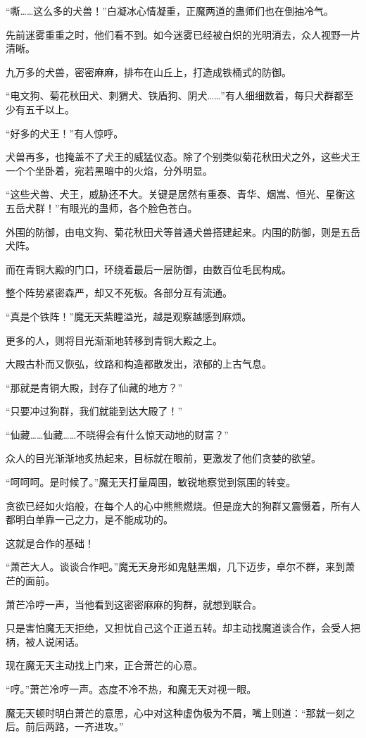 \begin{this_body}
“嘶……这么多的犬兽！”白凝冰心情凝重，正魔两道的蛊师们也在倒抽冷气。

先前迷雾重重之时，他们看不到。如今迷雾已经被白炽的光明消去，众人视野一片清晰。

九万多的犬兽，密密麻麻，排布在山丘上，打造成铁桶式的防御。

“电文狗、菊花秋田犬、刺猬犬、铁盾狗、阴犬……”有人细细数着，每只犬群都至少有五千以上。

“好多的犬王！”有人惊呼。

犬兽再多，也掩盖不了犬王的威猛仪态。除了个别类似菊花秋田犬之外，这些犬王一个个坐卧着，宛若黑暗中的火焰，分外明显。

“这些犬兽、犬王，威胁还不大。关键是居然有重泰、青华、烟嵩、恒光、星衡这五岳犬群！”有眼光的蛊师，各个脸色苍白。

外围的防御，由电文狗、菊花秋田犬等普通犬兽搭建起来。内围的防御，则是五岳犬阵。

而在青铜大殿的门口，环绕着最后一层防御，由数百位毛民构成。

整个阵势紧密森严，却又不死板。各部分互有流通。

“真是个铁阵！”魔无天紫瞳溢光，越是观察越感到麻烦。

更多的人，则将目光渐渐地转移到青铜大殿之上。

大殿古朴而又恢弘，纹路和构造都散发出，浓郁的上古气息。

“那就是青铜大殿，封存了仙藏的地方？”

“只要冲过狗群，我们就能到达大殿了！”

“仙藏……仙藏……不晓得会有什么惊天动地的财富？”

众人的目光渐渐地炙热起来，目标就在眼前，更激发了他们贪婪的欲望。

“呵呵呵。是时候了。”魔无天打量周围，敏锐地察觉到氛围的转变。

贪欲已经如火焰般，在每个人的心中熊熊燃烧。但是庞大的狗群又震慑着，所有人都明白单靠一己之力，是不能成功的。

这就是合作的基础！

“萧芒大人。谈谈合作吧。”魔无天身形如鬼魅黑烟，几下迈步，卓尔不群，来到萧芒的面前。

萧芒冷哼一声，当他看到这密密麻麻的狗群，就想到联合。

只是害怕魔无天拒绝，又担忧自己这个正道五转。却主动找魔道谈合作，会受人把柄，被人说闲话。

现在魔无天主动找上门来，正合萧芒的心意。

“哼。”萧芒冷哼一声。态度不冷不热，和魔无天对视一眼。

魔无天顿时明白萧芒的意思，心中对这种虚伪极为不屑，嘴上则道：“那就一刻之后。前后两路，一齐进攻。”


\end{this_body}
